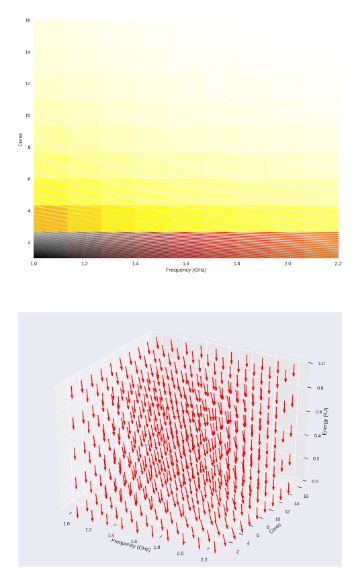 \begin{figure}[H]
	\centering
	\begin{subfigure}[b]{0.45\textwidth}
		\includegraphics[width=\textwidth]{models/figures/analisys/w1.png}
	\end{subfigure}
	\begin{subfigure}[b]{0.45\textwidth}
		\includegraphics[width=\textwidth]{models/figures/analisys/w1_3d.png}
	\end{subfigure}
\end{figure}
